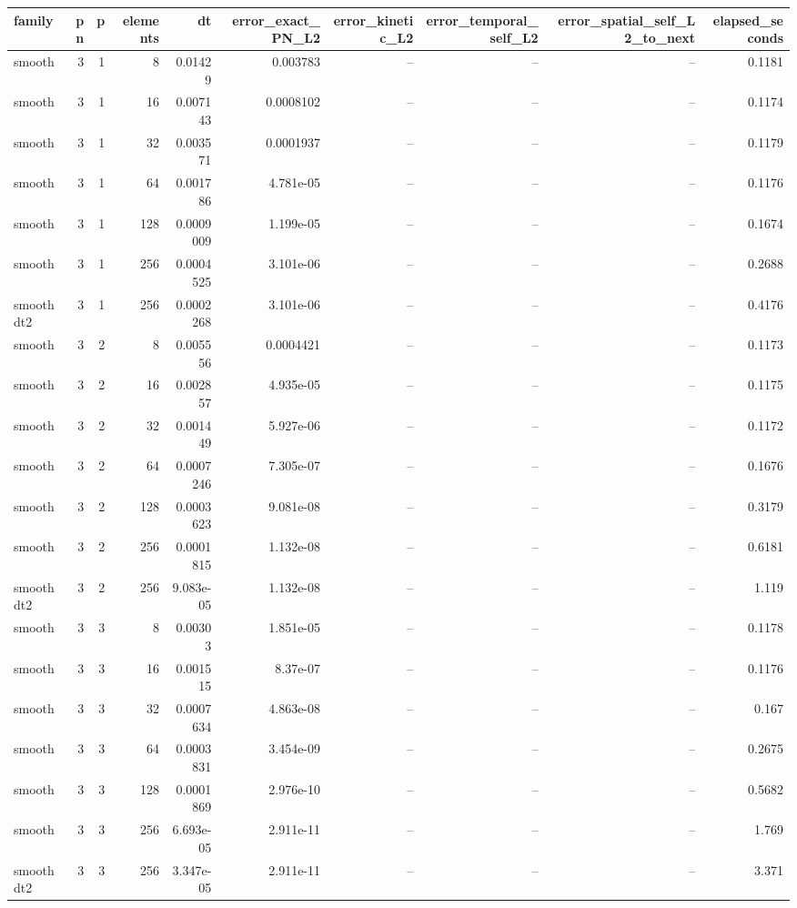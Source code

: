 \begin{tabular}{lrrrrrrrrr}
\hline
family & pn & p & elements & dt & error\_exact\_PN\_L2 & error\_kinetic\_L2 & error\_temporal\_self\_L2 & error\_spatial\_self\_L2\_to\_next & elapsed\_seconds \\
\hline
smooth & 3 & 1 & 8 & 0.01429 & 0.003783 & -- & -- & -- & 0.1181 \\
smooth & 3 & 1 & 16 & 0.007143 & 0.0008102 & -- & -- & -- & 0.1174 \\
smooth & 3 & 1 & 32 & 0.003571 & 0.0001937 & -- & -- & -- & 0.1179 \\
smooth & 3 & 1 & 64 & 0.001786 & 4.781e-05 & -- & -- & -- & 0.1176 \\
smooth & 3 & 1 & 128 & 0.0009009 & 1.199e-05 & -- & -- & -- & 0.1674 \\
smooth & 3 & 1 & 256 & 0.0004525 & 3.101e-06 & -- & -- & -- & 0.2688 \\
smoothdt2 & 3 & 1 & 256 & 0.0002268 & 3.101e-06 & -- & -- & -- & 0.4176 \\
smooth & 3 & 2 & 8 & 0.005556 & 0.0004421 & -- & -- & -- & 0.1173 \\
smooth & 3 & 2 & 16 & 0.002857 & 4.935e-05 & -- & -- & -- & 0.1175 \\
smooth & 3 & 2 & 32 & 0.001449 & 5.927e-06 & -- & -- & -- & 0.1172 \\
smooth & 3 & 2 & 64 & 0.0007246 & 7.305e-07 & -- & -- & -- & 0.1676 \\
smooth & 3 & 2 & 128 & 0.0003623 & 9.081e-08 & -- & -- & -- & 0.3179 \\
smooth & 3 & 2 & 256 & 0.0001815 & 1.132e-08 & -- & -- & -- & 0.6181 \\
smoothdt2 & 3 & 2 & 256 & 9.083e-05 & 1.132e-08 & -- & -- & -- & 1.119 \\
smooth & 3 & 3 & 8 & 0.00303 & 1.851e-05 & -- & -- & -- & 0.1178 \\
smooth & 3 & 3 & 16 & 0.001515 & 8.37e-07 & -- & -- & -- & 0.1176 \\
smooth & 3 & 3 & 32 & 0.0007634 & 4.863e-08 & -- & -- & -- & 0.167 \\
smooth & 3 & 3 & 64 & 0.0003831 & 3.454e-09 & -- & -- & -- & 0.2675 \\
smooth & 3 & 3 & 128 & 0.0001869 & 2.976e-10 & -- & -- & -- & 0.5682 \\
smooth & 3 & 3 & 256 & 6.693e-05 & 2.911e-11 & -- & -- & -- & 1.769 \\
smoothdt2 & 3 & 3 & 256 & 3.347e-05 & 2.911e-11 & -- & -- & -- & 3.371 \\

\end{tabular}
